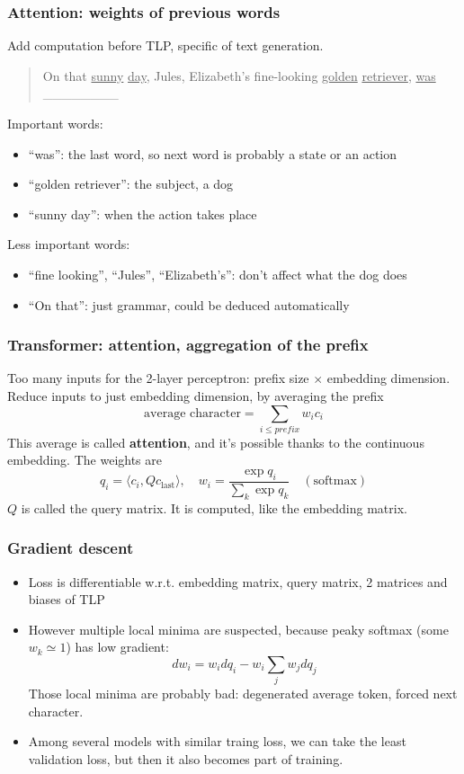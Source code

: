 \documentclass{beamer}
\begin{document}
\begin{frame}
\frametitle{Attention: weights of previous words}

Add computation before TLP, specific of text generation.

\bigskip
\begin{quote}
On that \underline{sunny} \underline{day}, Jules, Elizabeth's fine-looking \underline{golden} \underline{retriever}, \underline{was} \_\_\_\_\_\_\_\_
\end{quote}

\bigskip
Important words:
\begin{itemize}
\item ``was'': the last word, so next word is probably a state or an action
\item ``golden retriever'': the subject, a dog
\item ``sunny day'': when the action takes place
\end{itemize}
Less important words:
\begin{itemize}
\item ``fine looking'', ``Jules'', ``Elizabeth's'': don't affect what the dog does
\item ``On that'': just grammar, could be deduced automatically
\end{itemize}

\end{frame}

\begin{frame}
\frametitle{Transformer: attention, aggregation of the prefix}
Too many inputs for the 2-layer perceptron: prefix size $\times$ embedding dimension. Reduce inputs to just embedding dimension, by averaging the prefix
$$ \text{average character} = \sum_{i \leq prefix} w_i c_i $$
This average is called \textbf{attention}, and it's possible thanks to the continuous embedding. The weights are
$$ q_i = \langle c_i, Q c_{\text{last}} \rangle, \quad w_i = \frac{\exp q_i}{\sum_k \exp q_k} \quad (\text{softmax}) $$
$Q$ is called the query matrix. It is computed, like the embedding matrix.
\end{frame}

\begin{frame}
\frametitle{Gradient descent}
\begin{itemize}
\item Loss is differentiable w.r.t. embedding matrix, query matrix, 2 matrices and biases of TLP
\bigskip
\item However multiple local minima are suspected, because peaky softmax (some $w_k \simeq 1$) has low gradient:
$$ d w_i = w_i d q_i - w_i \sum_j w_j d q_j $$
Those local minima are probably bad: degenerated average token, forced next character.
\bigskip
\item Among several models with similar traing loss, we can take the least validation loss, but then it also becomes part of training.
\end{itemize}
\end{frame}
\end{document}
